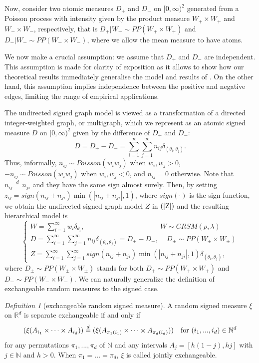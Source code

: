 \documentclass{article}
\theoremstyle{plain}
\theoremstyle{remark}
\newtheorem{definition}[theorem]{Definition}
\begin{document}
Now, consider two atomic measures $D_+$ and $D_-$ on $[0,\infty)^2$ generated from a Poisson process
with intensity given by the product measure $W_+\times W_+$ and $W_-\times W_-$, respectively, that is $D_+|W_+\sim PP(W_+\times W_+)$ and $D_-|W_-\sim PP(W_-\times W_-)$, where we allow the mean measure to have atoms. 

We now make a crucial assumption: we assume that $D_+$ and $D_-$ are independent. This assumption is made for clarity of exposition as it allows to show how our theoretical results immediately generalise the model and results of \citet{Caron-and-Fox}. On the other hand, this assumption implies independence between the positive and negative edges, limiting the range of empirical applications.

The undirected signed graph model is viewed as a transformation of a directed integer-weighted graph, or multigraph, which we represent as an atomic signed measure $D$ on $[0,\infty)^2$ given by the difference of $D_+$ and $D_-$:
\begin{equation*}
	D=D_+-D_-=\sum_{i=1}^\infty\sum_{j=1}^\infty n_{ij}\delta_{(\theta_i,\theta_j)}.
\end{equation*}
Thus, informally, $n_{ij}\sim Poisson (w_i w_j)$ when $w_i,w_j>0$, $-n_{ij}\sim Poisson (w_i w_j)$  when $w_i,w_j<0$, and $n_{ij}=0$ otherwise. Note that $n_{ij}\stackrel{d}{=}n_{ji}$ and they have the same sign almost surely. Then, by setting $z_{ij}=sign(n_{ij}+n_{ji})\min(|n_{ij}+n_{ji}|,1)$, where $sign(\cdot)$ is the sign function, we obtain the undirected signed graph model $Z$ in $(\ref{Z})$ and the resulting hierarchical model is
\begin{equation}\label{hierarchical}
	\begin{cases}
		W=\sum_{i=1}^{\infty}w_i\delta_{\theta_i}, \quad\quad\quad\quad\quad\quad\quad\quad\quad\quad\,\,\,\,\, W\sim CRSM(\rho,\lambda)\\
		D=\sum_{i=1}^\infty\sum_{j=1}^\infty n_{ij}\delta_{(\theta_i,\theta_j)}=D_+-D_-, \quad\,  D_\pm\sim PP(W_\pm\times W_\pm)\\
		Z=\sum_{i=1}^\infty\sum_{j=1}^\infty sign(n_{ij}+n_{ji})\min(|n_{ij}+n_{ji}|,1)\delta_{(\theta_i,\theta_j)},
	\end{cases}
\end{equation}
where $D_\pm\sim PP(W_\pm\times W_\pm)$ stands for both $D_+\sim PP(W_+\times W_+)$ and $D_-\sim PP(W_-\times W_-)$. We can naturally generalize the definition of exchangeable random measures to the signed case.
\begin{definition}
	[exchangeable random signed measure] A random signed measure $\xi$ on $\mathbb{R}^d$ is separate exchangeable if and only if 
	\begin{equation*}
		(	\xi(A_{i_1}\times\cdots\times A_{i_d}))\stackrel{d}{=}(	\xi(A_{\pi_1(i_1)}\times\cdots\times A_{\pi_d(i_d)}))\quad \textnormal{for $(i_1,...,i_d)\in\mathbb{N}^d$}
	\end{equation*}
	for any permutations $\pi_1,...,\pi_d$ of $\mathbb{N}$ and any intervals $A_j=[h(1-j),hj]$ with $j\in\mathbb{N}$ and $h>0$. When $\pi_1=...=\pi_d$, $\xi$ is called jointly exchangeable.
\end{definition}
\end{document}
